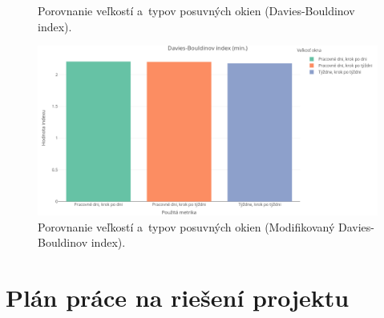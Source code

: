 \documentclass[a4paper,twoside,slovak,12pt,appendix]{article}
\begin{document}
\begin{appendices}
\begin{figure}[htbp]
  \caption{Porovnanie veľkostí a~typov posuvných okien (Davies-Bouldinov index).}
\end{figure}
\begin{figure}[htbp]
  \centering
  \includegraphics[width=\textwidth]{cvi/window_comparison/201903072017-DB-window_comparison.png}
  \caption{Porovnanie veľkostí a~typov posuvných okien (Modifikovaný Davies-Bouldinov index).}
\end{figure}

\newpage
\section{Plán práce na riešení projektu}

\end{appendices}
\end{document}

